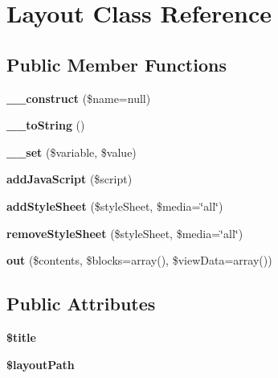 \hypertarget{class_layout}{
\section{Layout Class Reference}
\label{class_layout}
}
\subsection*{Public Member Functions}
\begin{DoxyCompactItemize}
\item 
\hypertarget{class_layout_a3e91ae4bf0e607a551e93fe200342e66}{
{\bfseries \_\-\_\-construct} (\$name=null)}
\label{class_layout_a3e91ae4bf0e607a551e93fe200342e66}

\item 
\hypertarget{class_layout_ad44a5f02a1b177c895749afc66a319b0}{
{\bfseries \_\-\_\-toString} ()}
\label{class_layout_ad44a5f02a1b177c895749afc66a319b0}

\item 
\hypertarget{class_layout_a991a09ebd9bbb8a2a97ab0ed317d6ec5}{
{\bfseries \_\-\_\-set} (\$variable, \$value)}
\label{class_layout_a991a09ebd9bbb8a2a97ab0ed317d6ec5}

\item 
\hypertarget{class_layout_a0267eee0134ba68ae33852b77edb355c}{
{\bfseries addJavaScript} (\$script)}
\label{class_layout_a0267eee0134ba68ae33852b77edb355c}

\item 
\hypertarget{class_layout_ad9beab7a6d5074882bd637cef9897ea1}{
{\bfseries addStyleSheet} (\$styleSheet, \$media=\char`\"{}all\char`\"{})}
\label{class_layout_ad9beab7a6d5074882bd637cef9897ea1}

\item 
\hypertarget{class_layout_ae457a995dde33f9702fd4f7aa81daeac}{
{\bfseries removeStyleSheet} (\$styleSheet, \$media=\char`\"{}all\char`\"{})}
\label{class_layout_ae457a995dde33f9702fd4f7aa81daeac}

\item 
\hypertarget{class_layout_a143132ecc4a9040b9c131b91da4da526}{
{\bfseries out} (\$contents, \$blocks=array(), \$viewData=array())}
\label{class_layout_a143132ecc4a9040b9c131b91da4da526}

\end{DoxyCompactItemize}
\subsection*{Public Attributes}
\begin{DoxyCompactItemize}
\item 
\hypertarget{class_layout_aff80f303442635e08788717fce98aba4}{
{\bfseries \$title}}
\label{class_layout_aff80f303442635e08788717fce98aba4}

\item 
\hypertarget{class_layout_abf63a949566076f325719bd3925ffa5c}{
{\bfseries \$layoutPath}}
\label{class_layout_abf63a949566076f325719bd3925ffa5c}

\end{DoxyCompactItemize}


